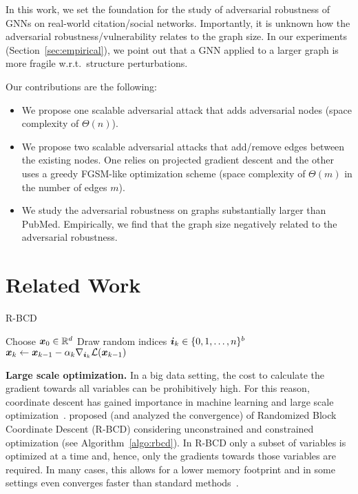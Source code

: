 \documentclass[letterpaper]{article} %
\begin{document}
In this work, we set the foundation for the study of adversarial robustness of GNNs on real-world citation/social networks. Importantly, it is unknown how the adversarial robustness/vulnerability relates to the graph size. In our experiments (Section~\ref{sec:empirical}), we point out that a GNN applied to a larger graph is more fragile w.r.t.\ structure perturbations.

Our contributions are the following:
\begin{itemize}
   \item We propose one scalable adversarial attack that adds adversarial nodes (space complexity of \(\Theta(n)\)).
   \item We propose two scalable adversarial attacks that add/remove edges between the existing nodes. One relies on projected gradient descent and the other uses a greedy FGSM-like optimization scheme (space complexity of \(\Theta(m)\) in the number of edges \(m\)).
   \item We study the adversarial robustness on graphs substantially larger than PubMed. Empirically, we find that the graph size negatively related to the adversarial robustness.
\end{itemize}

\section{Related Work}\label{sec:related} %

\begin{algorithm}[b]
    \small
	\caption{R-BCD~\citep{Nesterov2012}}
	\label{algo:rbcd}
	\begin{algorithmic}[1]
		\STATE Choose \({\bm{x}}_0 \in \mathbb{R}^d\)
		\STATE Draw random indices \({\bm{i}}_k \in \{0, 1, \dots, n\}^b\)
		\STATE \({\bm{x}}_{k} \leftarrow {\bm{x}}_{k-1} - \alpha_{k} \nabla_{{\bm{i}}_{k}} \mathcal{L}({\bm{x}}_{k-1})\)
		\ENDFOR
	\end{algorithmic}
\end{algorithm}

\textbf{Large scale optimization.} In a big data setting, the cost to calculate the gradient towards all variables can be prohibitively high. For this reason, coordinate descent has gained importance in machine learning and large scale optimization~\citep{Wright2015}. \citet{Nesterov2012} proposed (and analyzed the convergence) of Randomized Block Coordinate Descent (R-BCD) considering unconstrained and constrained optimization (see Algorithm~\ref{algo:rbcd}). In R-BCD only a subset of variables is optimized at a time and, hence, only the gradients towards those variables are required. In many cases, this allows for a lower memory footprint and in some settings even converges faster than standard methods~\citep{Nesterov2017}.
\end{document}
